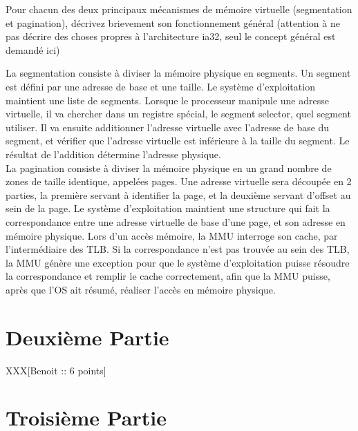 Pour chacun des deux principaux m\'ecanismes de m\'emoire virtuelle
(segmentation et pagination), d\'ecrivez brievement son fonctionnement
g\'en\'eral (attention \`a ne pas d\'ecrire des choses propres \`a
l'architecture ia32, seul le concept g\'en\'eral est demand\'e ici)

\begin{correction}

La segmentation consiste \`a diviser la m\'emoire physique en segments. Un
segment est d\'efini par une adresse de base et une taille. Le syst\`eme
d'exploitation maintient une liste de segments. Lorsque le processeur manipule
une adresse virtuelle, il va chercher dans un registre sp\'ecial, le segment
selector, quel segment utiliser. Il va ensuite additionner l'adresse virtuelle
avec l'adresse de base du segment, et v\'erifier que l'adresse virtuelle est
inf\'erieure \`a la taille du segment. Le r\'esultat de l'addition d\'etermine
l'adresse physique.\\

La pagination consiste \`a diviser la m\'emoire physique en un grand nombre de
zones de taille identique, appel\'ees pages. Une adresse virtuelle sera
d\'ecoup\'ee en 2 parties, la premi\`ere servant \`a identifier la page, et la
deuxi\`eme servant d'offset au sein de la page. Le syst\`eme d'exploitation
maintient une structure qui fait la correspondance entre une adresse virtuelle
de base d'une page, et son adresse en m\'emoire physique. Lors d'un acc\`es
m\'emoire, la MMU interroge son cache, par l'interm\'ediaire des TLB. Si la
correspondance n'est pas trouv\'ee au sein des TLB, la MMU g\'en\`ere une
exception pour que le syst\`eme d'exploitation puisse r\'esoudre la
correspondance et remplir le cache correctement, afin que la MMU puisse,
apr\`es que l'OS ait r\'esum\'e, r\'ealiser l'acc\`es en m\'emoire physique.

\end{correction}

%
%

\section{Deuxi\`eme Partie
         }

XXX[Benoit :: 6 points]

%
%

\section{Troisi\`eme Partie
         }

